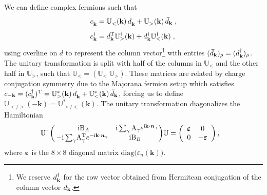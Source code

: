 We can define complex fermions such that
\begin{align}
    c_{\mathbf{k}}^\pd &= \mathbb{U}_{<}^\pd(\mathbf{k}) \, d_\mathbf{k}^\pd +  \mathbb{U}_{>}^\pd(\mathbf{k}) \, \bar{d}_\mathbf{k}\; , \\[4pt]
    c_{\mathbf{k}}^\dagger &=  d_\mathbf{k}^\T \mathbb{U}_{>}^\dagger(\mathbf{k}) +   d_\mathbf{k}^\dagger \mathbb{U}_{<}^\dagger(\mathbf{k}) \; ,
    \end{align}
using overline on $d$ to represent the column vector\footnote{We reserve $d_{\mathbf k}^\dagger$ for the row vector obtained from Hermitean conjugation of the column vector $d_{\mathbf k}$.} with entries $(\bar{d}_{\mb k})_\rho =(d_{\mb k}^\dagger)_\rho $.
The unitary transformation is split with half of the columns in $\mathbb{U}_{<}$ and the other half in $\mathbb{U}_{>}$, such that $\mathbb{U}_{<} = \left( \mathbb{U}_{<} \; \mathbb{U}_{>} \right)$.
These matrices are related by charge conjugation symmetry due to the Majorana fermion setup which satisfies $c_{-\mathbf{k}}= (c_{\mathbf{k}}^\dagger)^\T = \mathbb{U}_{>}^\ast(\mathbf{k}) \, d_\mathbf{k}^\pd +  \mathbb{U}_{<}^\ast(\mathbf{k}) \, \bar{d}_\mathbf{k} $, forcing us to define $\mathbb{U}_{</>}(-\mathbf{k})=\mathbb{U}_{>/<}^\ast(\mathbf{k})$.
The unitary transformation diagonalizes the Hamiltonian
    \begin{align}
    \mathbb{U}^\dagger
    \left(\begin{array}{cc}
         \mathrm{i} \mathrm{B}_{A} & \mathrm{i} \sum_{\gamma} \mathrm{A}_{\gamma} e^{\mathrm{i} \mathbf{k}\cdot \bm{n}_\gamma}\!\!\!  \\
         \!\!-\mathrm{i} \sum_{\gamma} \!\mathrm{A}_{\gamma}^{{\mathrm{T}}} e^{-\mathrm{i} \mathbf{k}\cdot \bm{n}_\gamma} & \mathrm{i} \mathrm{B}_{B}
    \end{array}\right)\! \mathbb{U} &=
    \left(\begin{array}{cc}
         \bm{\varepsilon} & 0\\
         0& -\bm{\varepsilon}
    \end{array}\right) ,
\end{align}
where $\bm{\varepsilon}$ is the $8\times 8$ diagonal matrix $\text{diag}\big(\varepsilon_n(\mathbf{k}) \big)$.

